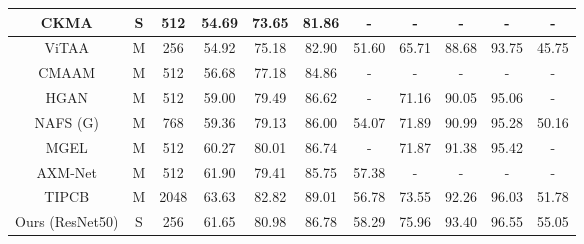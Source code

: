 \documentclass{bmvc2k}
\newcommand{\first}[1]{\textcolor{myred}{#1}}
\newcommand{\second}[1]{\textcolor{myblue}{#1}}
\begin{document}
\begin{table}[t]
\begin{center}
{\begin{tabular}{|c|c|c|c|c|c|c|c|c|c|c|}
\rowcolor[RGB]{230,230,230}
CKMA \cite{chen2021cmka}                             & S   & 512                             & 54.69           & 73.65           & 81.86            & -            & -               & -               & -                & -            \\ \hline
ViTAA \cite{wang2020vitaa}                           & M & 256                              & 54.92           & 75.18           & 82.90            & 51.60        & 65.71           & 88.68           & 93.75            & 45.75        \\ \hline
CMAAM \cite{aggarwal2020cmaam}                            & M  & 512                             & 56.68           & 77.18           & 84.86            & -            & -               & -               & -                & -            \\ \hline
HGAN \cite{zheng2020hierarchical}                         & M   & 512                              & 59.00           & 79.49           & 86.62            & -        & 71.16      & 90.05           & 95.06            & -        \\ \hline
NAFS (G) \cite{gao2021contextual}                            & M   & 768                           & 59.36           & 79.13          & 86.00            & 54.07            & 71.89               & 90.99               & 95.28                & 50.16            \\ \hline
MGEL \cite{wang2021mgel}                            & M & 512                             & 60.27           & 80.01          & 86.74            & -            & 71.87               & 91.38               & 95.42                & -            \\ \hline
AXM-Net \cite{farooq2021axm}                          & M & 512                             & 61.90           & 79.41           & 85.75            & 57.38       & -               & -               & -                & -            \\ \hline
TIPCB \cite{chen2021tipcb}                          & M  & 2048                            & \second{63.63}           & \first{82.82}           & \first{89.01}            & 56.78       & 73.55               & 92.26               & 96.03                & 51.78            \\ \hline
\rowcolor[RGB]{230,230,230}
Ours (ResNet50)                             & S  & 256                                   & 61.65           & 80.98           & 86.78            & \second{58.29}        & \second{75.96}           & \second{93.40}           & \second{96.55}            & \second{55.05}        \\ \hline

\end{tabular}}
\end{center}
\end{table}
\end{document}
